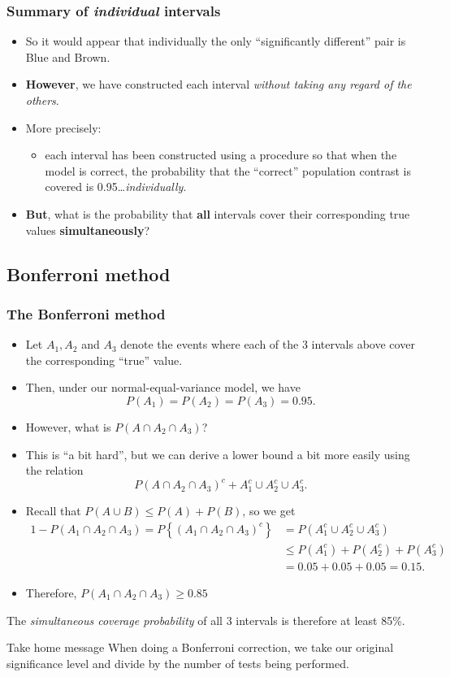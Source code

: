 \documentclass[a4paper]{article}\usepackage[]{graphicx}\usepackage[]{xcolor}
\begin{document}
\subsubsection{Summary of \textit{individual} intervals}
\begin{itemize}
	\item So it would appear that individually the only ``significantly different'' pair is Blue and Brown.
	\item \textbf{However}, we have constructed each interval \textit{without taking any regard of the others}.
	\item More precisely:
	\begin{itemize}
		\item each interval has been constructed using a procedure so that when the model is correct, the probability that the ``correct'' population contrast is covered is 0.95\dots \textit{individually}.
	\end{itemize}
	\item \textbf{But}, what is the probability that \textbf{all} intervals cover their corresponding true values \textbf{simultaneously}?
\end{itemize}
\subsection{Bonferroni method}
\subsubsection{The Bonferroni method}
\begin{itemize}
	\item Let \( A_1, A_2 \) and \( A_3 \) denote the events where each of the 3 intervals above cover the corresponding ``true'' value.
	\item Then, under our normal-equal-variance model, we have
	\[
		P(A_1)=P(A_2)=P(A_3)=0.95.
	\]
	\item However, what is \( P(A \cap A_2 \cap A_3) \)?
	\item This is ``a bit hard'', but we can derive a lower bound a bit more easily using the relation
	\[
		P(A \cap A_2 \cap A_3)^{c} + A^{c}_{1} \cup A^{c}_{2} \cup A^{c}_{3}.
	\]
	\item Recall that \( P(A \cup B) \leq P(A) + P(B) \), so we get
	\begin{align*}
		1- P \left( A_1\cap A_2\cap A_3 \right) = P\left\{ \left( A_1\cap A_2\cap A_3 \right)^c\right\}&= P\left(A_1^c\cup A_2^c\cup A_3^c\right) \\
		&\leq P(A_1^c)+P(A_2^c)+P(A_3^c)\\
		&= 0.05+0.05+0.05=0.15.
	\end{align*}
	\item Therefore, \( P(A_1 \cap A_2 \cap A_3) \geq 0.85 \) 
\end{itemize}
The \textit{simultaneous coverage probability} of all 3 intervals is therefore at least 85\%.
\begin{bluebox}{Take home message}
	When doing a Bonferroni correction, we take our original significance level and divide by the number of tests being performed.
\end{bluebox}
\end{document}
